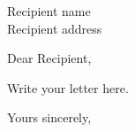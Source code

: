 \documentclass{letter}
\begin{document}
\begin{letter}{Recipient name\\Recipient address}
\opening{Dear Recipient,}
Write your letter here.
\closing{Yours sincerely,}
\end{letter}
\end{document}
